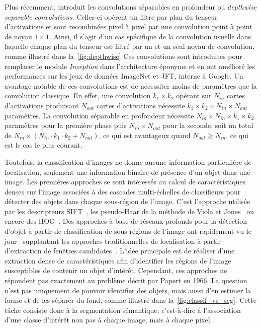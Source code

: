 Plus récemment, \cite{chollet_xception_2017} introduit les convolutions séparables en profondeur ou \emph{depthwise separable convolutions}. Celles-ci opèrent un filtre par plan du tenseur d'activations et sont recombinées pixel à pixel par une convolution point à point de noyau $1\times1$. Ainsi, il s'agit d'un cas spécifique de la convolution usuelle dans laquelle chaque plan du tenseur est filtré par un et un seul noyau de convolution, comme illustré dans la~\cref{fig:depthwise} Ces convolutions sont introduites pour remplacer le module \emph{Inception} dans l'architecture éponyme et en ont amélioré les performances sur les jeux de données ImageNet et JFT, interne à Google. Un avantage notable de ces convolutions est de nécessiter moins de paramètres que la convolution classique. En effet, une convolution $k_1 \times k_2$ opérant sur $N_{in}$ cartes d'activations produisant $N_{out}$ cartes d'activations nécessite $k_1 \times k_2 \times N_{in} \times N_{out}$ paramètres. La convolution séparable en profondeur nécessite $N_{in} \times N_{in} \times k_1 \times k_2$ paramètres pour la première phase puis $N_{in} \times N_{out}$ pour la seconde, soit un total de $N_{in} \times (N_{in} \cdot k_1 \cdot k_2 + N_{out})$, ce qui est avantageux quand $N_{out} \ge N_{in}$, ce qui est le cas le plus courant.

Toutefois, la classification d'images ne donne aucune information particulière de localisation, seulement une information binaire de présence d'un objet dans une image. Les premières approches se sont intéressés au calcul de caractéristiques denses sur l'image associées à des cascades multi-échelles de classifieurs pour détecter des objets dans chaque sous-région de l'image. C'est l'approche utilisée par les descripteurs \gls{SIFT}~\cite{lowe_object_1999}, les pseudo-Haar de la méthode de Viola et Jones~\cite{viola_robust_2001} ou encore des \gls{HOG}~\cite{dalal_histograms_2005}. Des approches à base de réseaux profonds pour la détection d'objet à partir de classification de sous-régions de l'image ont rapidement vu le jour~\cite{girshick_rich_2014,liu_ssd_2016,girshick_region-based_2016} supplantant les approches traditionnelles de localisation à partir d'extraction de fenêtres candidates~\cite{gu_recognition_2009,uijlings_selective_2013}. L'idée principale est de réaliser d'une extraction dense de caractéristiques afin d'identifier les régions de l'image susceptibles de contenir un objet d'intérêt. Cependant, ces approches ne répondent pas exactement au problème décrit par Papert en 1966. La question n'est pas uniquement de pouvoir identifier des objets, mais aussi d'en estimer la forme et de les séparer du fond, comme illustré dans la~\cref{fig:classif_vs_seg}. Cette tâche consiste donc à la segmentation sémantique, c'est-à-dire à l'association d'une classe d'intérêt non pas à chaque image, mais à chaque pixel.

